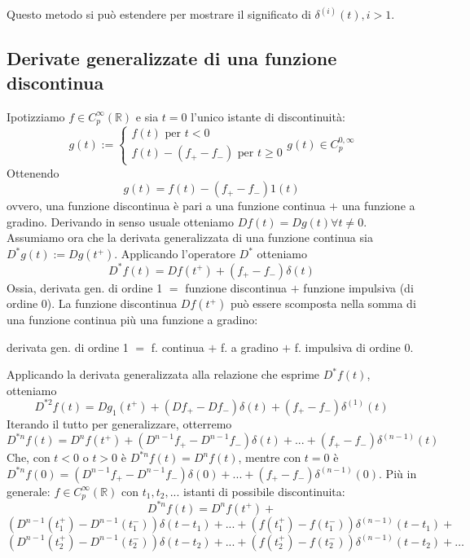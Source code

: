 \documentclass[11pt]{article}
\begin{document}
Questo metodo si può estendere per mostrare il significato di $\delta^{(i)} (t), i>1$.
\subsection{Derivate generalizzate di una funzione discontinua}
Ipotizziamo $f \in C_p^\infty(\mathbb{R})$ e sia $t=0$ l'unico istante di discontinuità:
\begin{displaymath}
    g(t) := \begin{cases}
        f(t) \textrm{ per } t<0\\
        f(t)-(f_+ - f_-) \textrm{ per }t\ge0
    \end{cases}
    g(t) \in C_p^{0, \infty}
\end{displaymath}
Ottenendo
\begin{displaymath}
    g(t) = f(t) - (f_+ - f_-)1(t)
\end{displaymath}
ovvero, una funzione discontinua è pari a una funzione continua $+$ una funzione a gradino.
Derivando in senso usuale otteniamo $Df(t) = Dg(t) \forall t \neq 0$. Assumiamo ora che la derivata generalizzata di una funzione continua sia $D^* g(t) := Dg(t^+)$. Applicando l'operatore $D^*$ otteniamo
\begin{displaymath}
    D^* f(t) = Df(t^+) + (f_+ - f_-)\delta(t)
\end{displaymath}
Ossia, derivata gen. di ordine 1 $=$ funzione discontinua $+$ funzione impulsiva (di ordine 0). La funzione discontinua $Df(t^+)$ può essere scomposta nella somma di una funzione continua più una funzione a gradino:
\begin{center}
    derivata gen. di ordine 1 $=$ f. continua $+$ f. a gradino $+$ f. impulsiva di ordine 0. 
\end{center}
Applicando la derivata generalizzata alla relazione che esprime $D^*f(t)$, otteniamo
\begin{displaymath}
    D^{*2} f(t) = Dg_1(t^+) + (Df_+ - Df_-)\delta(t) + (f_+ - f_-)\delta^{(1)}(t)
\end{displaymath}
Iterando il tutto per generalizzare, otterremo 
\begin{displaymath}
    D^{*n} f(t) = D^n f(t^+) + (D^{n-1} f_+ - D^{n-1} f_-) \delta(t)+...+(f_+ - f_-)\delta^{(n-1)}(t)
\end{displaymath}
Che, con $t<0$ o $t>0$ è $D^{*n} f(t) = D^n f(t)$, mentre con $t=0$ è $D^{*n} f(0) = (D^{n-1} f_+ - D^{n-1} f_-) \delta(0) + ... + (f_+-f_-)\delta^{(n-1)}(0)$.
Più in generale: $f \in C_p^\infty (\mathbb{R})$ con $t_1,t_2,...$ istanti di possibile discontinuita:
\begin{displaymath}
D^{*n} f(t) = D^n f(t^+)+\end{displaymath}\begin{displaymath}
\left(D^{n-1}(t_1^+) - D^{n-1}(t_1^-)\right)\delta(t-t_1)+...+\left(f(t_1^+)-f(t_1^-)\right)\delta^{(n-1)}(t-t_1)+\end{displaymath}\begin{displaymath}
\left(D^{n-1}(t_2^+) - D^{n-1}(t_2^-)\right)\delta(t-t_2)+...+\left(f(t_2^+)-f(t_2^-)\right)\delta^{(n-1)}(t-t_2)+\dots
\end{displaymath}
\end{document}
